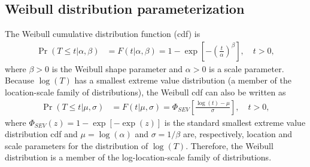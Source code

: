 \documentclass[12pt]{article}
\begin{document}
\subsection{Weibull distribution parameterization}
\label{sec:Weibull parameterization}
The Weibull cumulative
 distribution function (cdf) is
\begin{align}
\label{equation:weibull.cdf}
\Pr(T \leq t|\alpha,\beta ) &= F(t|\alpha,\beta)=1-
\exp \left [-\left (\frac{t}{\alpha} \right )^{\beta}
\right ], \quad t > 0,
\end{align}
where $\beta>0$ is the Weibull shape parameter and $\alpha>0$ is a
scale parameter. Because $\log(T)$ has a smallest extreme value
distribution (a member of the location-scale family of
distributions), the Weibull cdf can also be written as
\begin{align*}
\Pr(T \leq t| \mu,\sigma ) &= F(t| \mu,\sigma)= \Phi_{SEV}\left[\frac{\log(t)-\mu}{\sigma}\right], \quad t > 0,
\end{align*}
where $\Phi_{SEV}(z)=1-\exp[-\exp(z)]$ is the standard smallest extreme value
distribution cdf and
$\mu=\log(\alpha)$ and $\sigma=1/\beta$ are, respectively, location
and scale parameters for the distribution of $\log(T)$. Therefore, the Weibull
distribution is a member of the log-location-scale family of
distributions.
\end{document}

